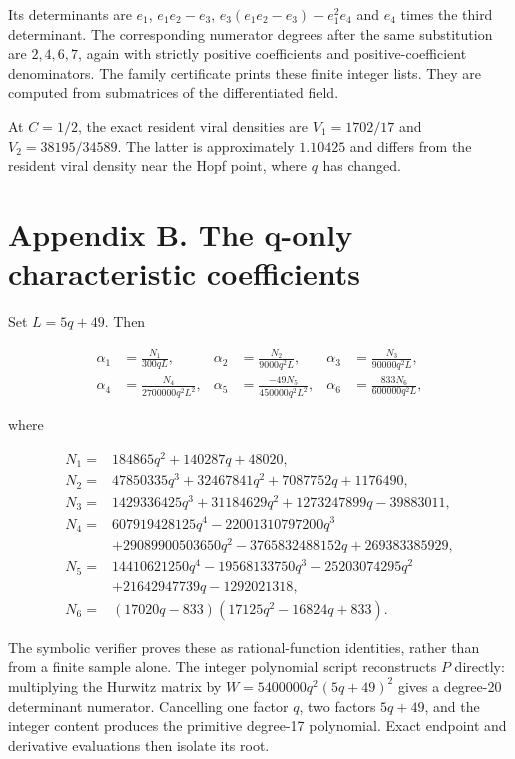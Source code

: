 \documentclass[
  11pt,
]{article}
\begin{document}
Its determinants are \(e_1\), \(e_1e_2-e_3\),
\(e_3(e_1e_2-e_3)-e_1^2e_4\) and \(e_4\) times the third determinant.
The corresponding numerator degrees after the same substitution are
\(2,4,6,7\), again with strictly positive coefficients and
positive-coefficient denominators. The family certificate prints these
finite integer lists. They are computed from submatrices of the
differentiated field.

At \(C=1/2\), the exact resident viral densities are \(V_1=1702/17\) and
\(V_2=38195/34589\). The latter is approximately \(1.10425\) and differs
from the resident viral density near the Hopf point, where \(q\) has
changed.

\section{Appendix B. The q-only characteristic
coefficients}\label{appendix-b.-the-q-only-characteristic-coefficients}

Set \(L=5q+49\). Then

\[
\begin{aligned}
\alpha_1&=\frac{N_1}{300qL},&
\alpha_2&=\frac{N_2}{9000q^2L},&
\alpha_3&=\frac{N_3}{90000q^2L},\\
\alpha_4&=\frac{N_4}{2700000q^2L^2},&
\alpha_5&=\frac{-49N_5}{450000q^2L^2},&
\alpha_6&=\frac{833N_6}{600000q^2L},
\end{aligned}
\]

where

\[
\begin{aligned}
N_1={}&184865q^2+140287q+48020,\\
N_2={}&47850335q^3+32467841q^2+7087752q+1176490,\\
N_3={}&1429336425q^3+31184629q^2+1273247899q-39883011,\\
N_4={}&607919428125q^4-22001310797200q^3\\
&+29089900503650q^2-3765832488152q+269383385929,\\
N_5={}&14410621250q^4-19568133750q^3-25203074295q^2\\
&+21642947739q-1292021318,\\
N_6={}&(17020q-833)(17125q^2-16824q+833).
\end{aligned}
\]

The symbolic verifier proves these as rational-function identities,
rather than from a finite sample alone. The integer polynomial script
reconstructs \(P\) directly: multiplying the Hurwitz matrix by
\(W=5400000q^2(5q+49)^2\) gives a degree-20 determinant numerator.
Cancelling one factor \(q\), two factors \(5q+49\), and the integer
content produces the primitive degree-17 polynomial. Exact endpoint and
derivative evaluations then isolate its root.
\end{document}

